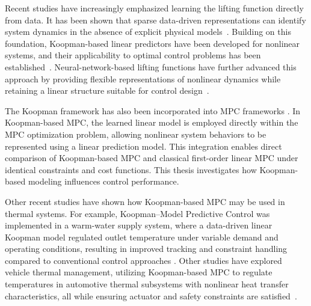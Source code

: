 Recent studies have increasingly emphasized learning the lifting function directly from data. It has been shown that sparse data-driven representations can identify system dynamics in the absence of explicit physical models \cite{brunton2016}. Building on this foundation, Koopman-based linear predictors have been developed for nonlinear systems, and their applicability to optimal control problems has been established \cite{korda2018}. Neural-network-based lifting functions have further advanced this approach by providing flexible representations of nonlinear dynamics while retaining a linear structure suitable for control design \cite{koopman_mpc_review}.


The Koopman framework has also been incorporated into MPC frameworks \cite{korda2018}.
In Koopman-based MPC, the learned linear model is employed directly within the MPC optimization problem, allowing nonlinear system behaviors to be represented using a linear prediction model. 
This integration enables direct comparison of Koopman-based MPC and classical first-order linear MPC under identical constraints and cost functions. This thesis investigates how Koopman-based modeling influences control performance.


Other recent studies have shown how Koopman-based MPC may be used in thermal systems. For example, Koopman–Model Predictive Control was implemented in a warm-water supply system, where a data-driven linear Koopman model regulated outlet temperature under variable demand and operating conditions, resulting in improved tracking and constraint handling compared to conventional control approaches \cite{miyashita2022koopman}.
Other studies have explored vehicle thermal management, utilizing Koopman-based MPC to regulate temperatures in automotive thermal subsystems with nonlinear heat transfer characteristics, all while ensuring actuator and safety constraints are satisfied \cite{chen2025koopman_tms}.





